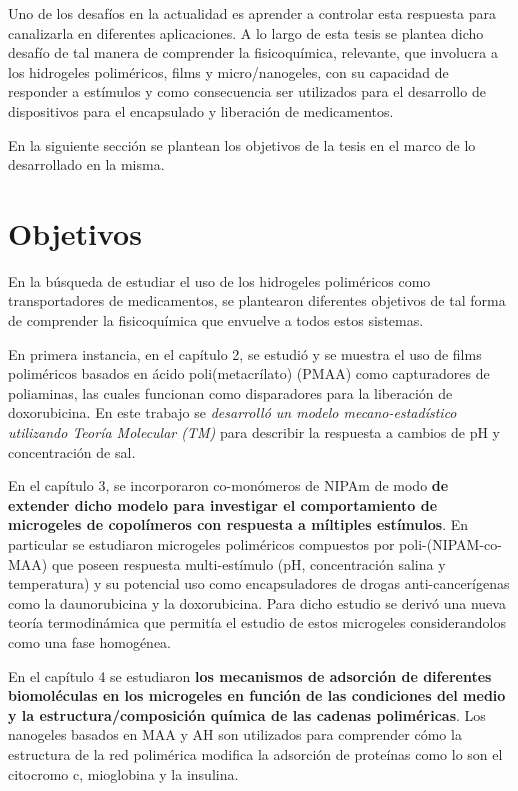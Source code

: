 Uno de los desaf\'ios en la actualidad es aprender a controlar esta respuesta para canalizarla en diferentes aplicaciones. A lo largo de esta tesis se plantea dicho desaf\'io de tal manera de comprender la fisicoqu\'imica, relevante,  que involucra a los hidrogeles polim\'ericos, films y micro/nanogeles, con su capacidad de responder a est\'imulos y como consecuencia ser utilizados para el desarrollo de dispositivos para el encapsulado y liberaci\'on de medicamentos.

En la siguiente secci\'on se plantean los objetivos de la tesis en el marco de lo desarrollado en la misma.


\section{Objetivos}

En la b\'usqueda de estudiar el uso de los hidrogeles polim\'ericos como transportadores de medicamentos, se plantearon diferentes objetivos de tal forma de comprender la fisicoqu\'imica que envuelve a todos estos sistemas.

En primera instancia, en el cap\'itulo 2, se estudi\'o y se muestra el uso de films polim\'ericos basados en \'acido poli(metacr\'ilato) (PMAA) como capturadores de poliaminas, las cuales funcionan como disparadores para la liberaci\'on de doxorubicina. En este trabajo se \textit{desarroll\'o un modelo mecano-estad\'istico utilizando Teor\'ia Molecular (TM)} para describir la respuesta a cambios de pH y concentraci\'on de sal.

En el cap\'itulo 3, se incorporaron co-mon\'omeros de NIPAm de modo \textbf{de extender dicho modelo para investigar el comportamiento de microgeles de copol\'imeros con respuesta a m\'iltiples est\'imulos}. En particular se estudiaron microgeles polim\'ericos compuestos por poli-(NIPAM-co-MAA) que poseen respuesta multi-est\'imulo (pH, concentraci\'on salina y temperatura) y su potencial uso como encapsuladores de drogas anti-cancer\'igenas como la daunorubicina y la doxorubicina.
Para dicho estudio se deriv\'o una nueva teor\'ia termodin\'amica que permit\'ia el estudio de estos microgeles considerandolos como una fase homog\'enea.

En el cap\'itulo 4 se estudiaron \textbf{los mecanismos de adsorci\'on de diferentes biomol\'eculas en los microgeles en funci\'on de las condiciones del medio y la estructura/composici\'on qu\'imica de las cadenas polim\'ericas}. Los nanogeles basados en MAA y AH son utilizados para comprender c\'omo la estructura de la red polim\'erica modifica la adsorci\'on de prote\'inas como lo son el citocromo c, mioglobina y la insulina.

